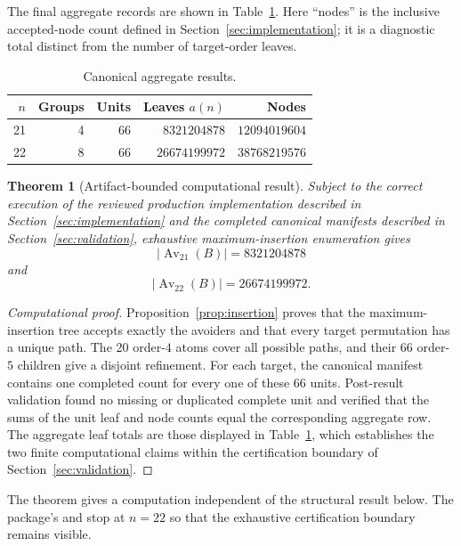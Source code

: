 \documentclass[11pt]{article}
\newtheorem{theorem}{Theorem}
\theoremstyle{definition}
\theoremstyle{remark}
\begin{document}
The final aggregate records are shown in Table~\ref{tab:results}.  Here
``nodes'' is the inclusive accepted-node count defined in
Section~\ref{sec:implementation}; it is a diagnostic total distinct from the
number of target-order leaves.

\begin{table}[htbp]
\centering
\caption{Canonical aggregate results.}
\label{tab:results}
\begin{tabular}{rrrrr}
\toprule
$n$ & Groups & Units & Leaves $a(n)$ & Nodes \\
\midrule
21 & 4 & 66 & $8321204878$ & $12094019604$ \\
22 & 8 & 66 & $26674199972$ & $38768219576$ \\
\bottomrule
\end{tabular}
\end{table}

\begin{theorem}[Artifact-bounded computational result]
\label{thm:main}
Subject to the correct execution of the reviewed production implementation
described in Section~\ref{sec:implementation} and the completed canonical
manifests described in Section~\ref{sec:validation}, exhaustive
maximum-insertion enumeration gives
\[
 \lvert\operatorname{Av}_{21}(B)\rvert=8321204878
\]
and
\[
 \lvert\operatorname{Av}_{22}(B)\rvert=26674199972.
\]
\end{theorem}

\begin{proof}[Computational proof]
Proposition~\ref{prop:insertion} proves that the maximum-insertion tree accepts
exactly the avoiders and that every target permutation has a unique path.  The
20 order-$4$ atoms cover all possible paths, and their 66 order-$5$ children
give a disjoint refinement.  For each target, the canonical manifest contains
one completed count for every one of these 66 units.  Post-result validation
found no missing or duplicated complete unit and verified that the sums of
the unit leaf and node counts equal the corresponding aggregate row.  The
aggregate leaf totals are those displayed in Table~\ref{tab:results}, which
establishes the two finite computational claims within the certification boundary
of Section~\ref{sec:validation}.
\end{proof}

The theorem gives a computation independent of the structural result below.
The package's  and
 stop at $n=22$ so that the exhaustive
certification boundary remains visible.
\end{document}
